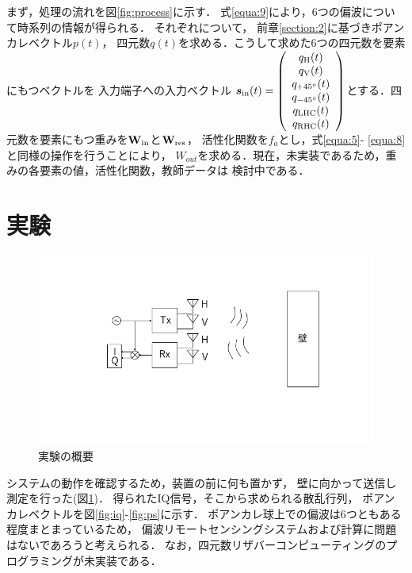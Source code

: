 \documentclass[uplatex,a4paper,10pt]{jsarticle}
\begin{document}
まず，処理の流れを図\ref{fig:process}に示す．
式\ref{equa:9}により，6つの偏波について時系列の情報が得られる．
それぞれについて，
前章\ref{section:2}に基づきポアンカレベクトル$p(t)$，
四元数$q(t)$を求める．こうして求めた6つの四元数を要素にもつベクトルを
入力端子への入力ベクトル
$\bm{s}_{\rm{in}}(t) = 
\left(
    \begin{array}{c}
        q_{\rm{H}}(t)\\
        q_{\rm{V}}(t)\\
        q_{+45^\circ}(t)\\
        q_{-45^\circ}(t)\\
        q_{\rm{LHC}}(t)\\
        q_{\rm{RHC}}(t)
    \end{array}
\right)$とする．四元数を要素にもつ重みを$\bf{W_{\rm{in}}}$と$\bf{W_{\rm{res}}}$，
活性化関数を$f_a$とし，式\ref{equa:5}- \ref{equa:8}と同様の操作を行うことにより，
$W_{out}$を求める．現在，未実装であるため，重みの各要素の値，活性化関数，教師データは
検討中である．


\section{実験}
\begin{figure}[hbtp]
	\centering
	\includegraphics[scale=0.4]{../img/exp.png}
    \caption{実験の概要}
	\label{fig:exp}
\end{figure}
システムの動作を確認するため，装置の前に何も置かず，
壁に向かって送信し測定を行った(図\ref{fig:exp})．
得られたIQ信号，そこから求められる散乱行列，
ポアンカレベクトルを図\ref{fig:iq}-\ref{fig:ps}に示す．
ポアンカレ球上での偏波は6つともある程度まとまっているため，
偏波リモートセンシングシステムおよび計算に問題はないであろうと考えられる．
なお，四元数リザバーコンピューティングのプログラミングが未実装である．
\end{document}
